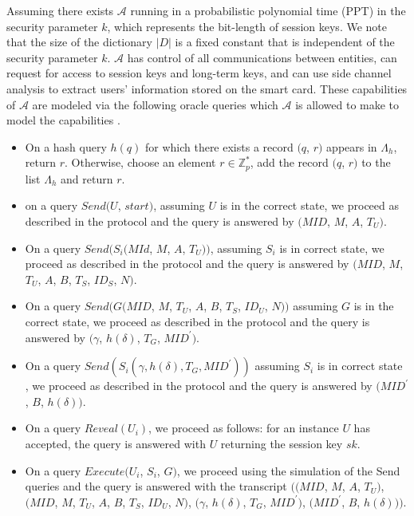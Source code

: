 \documentclass[a4paper,12pt]{report}
\begin{document}
Assuming there exists $\mathcal{A}$ running in a probabilistic
polynomial time (PPT) in the security parameter $k$, which
represents the bit-length of session keys. We note that the size of
the dictionary $|D|$ is a fixed constant that is independent of the
security parameter $k$. $\mathcal{A}$ has control of all
communications between entities, can request for access to session
keys and long-term keys, and can use side channel analysis to
extract users' information stored on the smart card. These
capabilities of $\mathcal{A}$ are modeled via the following oracle
queries which $\mathcal{A}$ is allowed to make to model the
capabilities .

\begin{itemize}
\item On a hash query $h(q)$ for which there exists a record $(q$, $r)$
appears in $\Lambda_h$, return $r$. Otherwise, choose an element $r
\in\mathbb{Z}_{p}^{*}$, add the record $(q$, $r)$ to the list
$\Lambda_h$ and return $r$.

\item on a query $Send(U$, $start)$, assuming $U$ is in the correct state,
we proceed as described in the protocol and the query is answered by
$(MID$, $M$, $A$, $T_U)$.

\item On a query $Send(S_{i}(MId$, $M$, $A$, $T_U))$, assuming $S_{i}$ is in
correct state, we proceed as described in the protocol and the query
is answered by $(MID$, $M$, $T_U $, $A$, $B$, $T_S$, $ID_S$, $N)$.

\item On a query $Send(G(MID$, $M$, $T_U$, $A$, $B$, $T_S$, $ID_U$, $N))$
assuming $G$ is in the correct state, we proceed as described in the
protocol and the query is answered by $(\gamma$, $h(\delta)$, $T_G$,
$MID^{\prime})$.

\item On a query $Send(S_{i}(\gamma,h(\delta),T_G,MID^{\prime}))$ assuming
$S_{i}$ is in correct state , we proceed as described in the
protocol and the query is answered by $(MID^{\prime}$, $B$,
$h(\delta))$.

\item On a query $Reveal(U_{i})$, we proceed as follows: for an instance
$U$ has accepted, the query is answered with $U$ returning the
session key $sk$.

\item On a query $Execute(U_{i}$, $S_{i}$, $G)$, we proceed using the
simulation of the Send queries and the query is answered with the
transcript $((MID$, $M$, $A$, $T_U)$, $(MID$, $M$, $T_U$, $A$, $B$,
$T_S$, $ID_U$, $N)$, $(\gamma$, $h(\delta)$, $T_G$, $MID^{\prime})$,
$(MID^{\prime}$, $B$, $h(\delta)))$.


\end{itemize}
\end{document}
